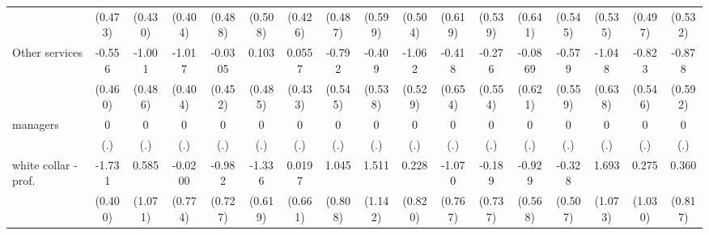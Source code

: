 {\begin{tabular}{l*{16}{c}}
                    &     (0.473)         &     (0.430)         &     (0.404)         &     (0.488)         &     (0.508)         &     (0.426)         &     (0.487)         &     (0.599)         &     (0.504)         &     (0.619)         &     (0.539)         &     (0.641)         &     (0.545)         &     (0.535)         &     (0.497)         &     (0.532)         \\
[1em]
Other services      &      -0.556         &      -1.001\sym{*}  &      -1.017\sym{*}  &     -0.0305         &       0.103         &      0.0557         &      -0.792         &      -0.409         &      -1.062\sym{*}  &      -0.418         &      -0.276         &     -0.0869         &      -0.579         &      -1.048         &      -0.823         &      -0.878         \\
                    &     (0.460)         &     (0.486)         &     (0.404)         &     (0.452)         &     (0.485)         &     (0.433)         &     (0.545)         &     (0.538)         &     (0.529)         &     (0.654)         &     (0.554)         &     (0.621)         &     (0.559)         &     (0.638)         &     (0.546)         &     (0.592)         \\
[1em]
managers            &           0         &           0         &           0         &           0         &           0         &           0         &           0         &           0         &           0         &           0         &           0         &           0         &           0         &           0         &           0         &           0         \\
                    &         (.)         &         (.)         &         (.)         &         (.)         &         (.)         &         (.)         &         (.)         &         (.)         &         (.)         &         (.)         &         (.)         &         (.)         &         (.)         &         (.)         &         (.)         &         (.)         \\
[1em]
white collar - prof.&      -1.731\sym{***}&       0.585         &     -0.0200         &      -0.982         &      -1.336\sym{*}  &      0.0197         &       1.045         &       1.511         &       0.228         &      -1.070         &      -0.189         &      -0.929         &      -0.328         &       1.693         &       0.275         &       0.360         \\
                    &     (0.400)         &     (1.071)         &     (0.774)         &     (0.727)         &     (0.619)         &     (0.661)         &     (0.808)         &     (1.142)         &     (0.820)         &     (0.767)         &     (0.737)         &     (0.568)         &     (0.507)         &     (1.073)         &     (1.030)         &     (0.817)         \\

\end{tabular}}
